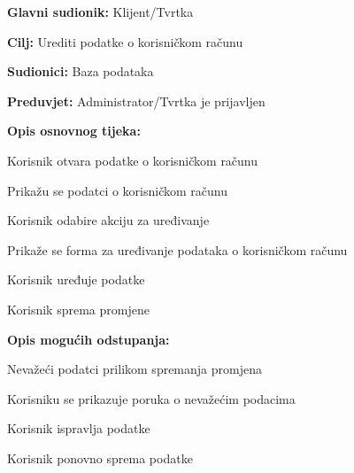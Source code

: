 \noindent {}
\begin{packed_item}
	
	\item \textbf{Glavni sudionik:} Klijent/Tvrtka
	\item  \textbf{Cilj:} Urediti podatke o korisničkom računu
	\item  \textbf{Sudionici:} Baza podataka
	\item  \textbf{Preduvjet:} Administrator/Tvrtka je prijavljen
	\item  \textbf{Opis osnovnog tijeka:}
	
	\item[] \begin{packed_enum}
		
		\item Korisnik otvara podatke o korisničkom računu
		\item Prikažu se podatci o korisničkom računu
		\item Korisnik odabire akciju za uređivanje
		\item Prikaže se forma za uređivanje podataka o korisničkom računu
		\item Korisnik uređuje podatke
		\item Korisnik sprema promjene
	
	\end{packed_enum}
	
	\item  \textbf{Opis mogućih odstupanja:}
	
	\item[] \begin{packed_item}
		
		\item[6.a] Nevažeći podatci prilikom spremanja promjena
		\item[] \begin{packed_enum}
			
			\item Korisniku se prikazuje poruka o nevažećim podacima
			\item Korisnik ispravlja podatke
			\item Korisnik ponovno sprema podatke
			
		\end{packed_enum}
		
	\end{packed_item}
\end{packed_item}

